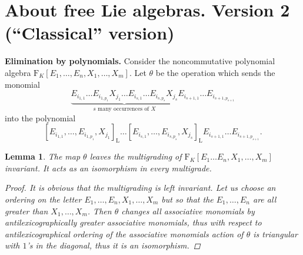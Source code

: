 \documentclass[11pt,a4paper]{amsart}
\newcommand{\plabel}[1]{ \label{#1}}
\newcommand{\snewpage}{}
\newcommand{\plabel}[1]{ \label{#1}\rlap{\smash{${}^{^{[#1]}}$}}}
\newcommand{\snewpage}{\newpage}
\newcommand{\plabel}[1]{ \label{#1}}
\newcommand{\snewpage}{}
\theoremstyle{definition}
\theoremstyle{plain}
\newtheorem{lemma}[point]{Lemma}
\begin{document}
\snewpage
\section{About free Lie algebras. Version 2 (``Classical'' version)}\plabel{sec:free2}
\textbf{Elimination by polynomials.}
Consider the noncommutative polynomial  algebra $\mathrm F_K[E_1,\ldots, E_n, X_1,\ldots,X_m ]$.
Let $\theta$ be the operation  which sends the monomial
\begin{equation}
\underbrace{E_{i_{1,1}}\ldots E_{i_{1,p_1}}X_{j_1}\ldots E_{i_{s,1}}\ldots E_{i_{s,p_s}}X_{j_s}}_{\text{$s$ many occurrences of $X$}} E_{i_{s+1,1}}\ldots E_{i_{s+1,p_{s+1}}}\plabel{eq:word}
\end{equation}
into the polynomial
\[[E_{i_{1,1}},\ldots ,E_{i_{1,p_1}},X_{j_1}]_{\mathrm L}\ldots [E_{i_{s,1}},\ldots ,E_{i_{s,p_s}},X_{j_s}]_{\mathrm L} E_{i_{s+1,1}}\ldots E_{i_{s+1,p_{s+1}}}.\]
\begin{lemma}\plabel{lem:prerec}
The map $\theta$  leaves the multigrading of $\mathrm F_K[E_1\ldots E_n, X_1,\ldots,X_m ]$ invariant.
It acts as an isomorphism in every multigrade.
\begin{proof}
It is obvious that the multigrading is left invariant.
Let us choose an ordering on the letter $E_1,\ldots, E_n, X_1,\ldots,X_m$
 but so that the $E_1,\ldots, E_n$ are all greater than $X_1,\ldots,X_m$.
Then $\theta$ changes all associative monomials by antilexicographically greater associative monomials, thus
 with respect to antilexicographical ordering of the associative monomials
 action of $\theta$ is triangular with $1$'s in the diagonal, thus it is an isomorphism.
\end{proof}
\end{lemma}
\end{document}
